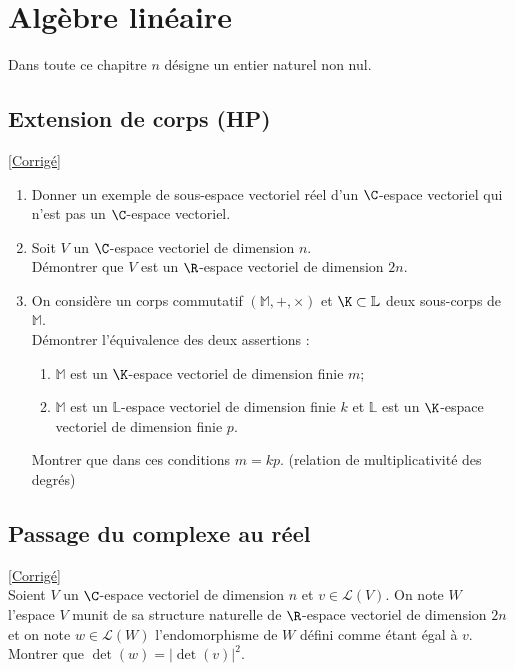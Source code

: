 \documentclass[8pt]{book}
\begin{document}
\chapter{Algèbre linéaire}
Dans toute ce chapitre $n$ désigne un entier naturel non nul.\\
\section{Extension de corps  (HP)}
\label{Extension de corps}
\textcolor{blue}{\hyperref[Extension de corps corrigé]{[Corrigé]}}\\
\begin{enumerate}[leftmargin=*]
	\item Donner un exemple de sous-espace vectoriel réel d'un $\C$-espace vectoriel qui n'est pas un $\C$-espace vectoriel.
	\item Soit $V$ un $\C$-espace vectoriel de dimension $n$.\\
	Démontrer que $V$ est un $\R$-espace vectoriel de dimension $2n$.
	\item On considère un corps commutatif $(\mathbb M,+,\times)$ et $\K\subset\mathbb L$ deux sous-corps de $\mathbb M$. \\
	Démontrer l'équivalence des deux assertions :
	\begin{enumerate}[label=(\roman*)]
		\item $\mathbb M$ est un $\K$-espace vectoriel de dimension finie $m$;
		\item $\mathbb M$ est un $\mathbb L$-espace vectoriel de dimension finie $k$ et $\mathbb L$ est un $\K$-espace vectoriel de dimension finie $p$.
	\end{enumerate}
	Montrer que dans ces conditions $m=kp$. (relation de multiplicativité des degrés)
\end{enumerate}

\section{Passage du complexe au réel }
\label{Passage du complexe au réel}
\textcolor{blue}{\hyperref[Passage du complexe au réel corrigé]{[Corrigé]}}\\
Soient $V$ un $\C$-espace vectoriel de dimension $n$ et $v\in \mathcal L(V)$. On note $W$ l'espace $V$ munit de sa structure naturelle de $\R$-espace vectoriel de dimension $2n$ et on note $w\in \mathcal L(W)$ l'endomorphisme de $W$ défini comme étant égal à $v$.\\
Montrer que $\det(w)=|\det(v)|^2$.
\end{document}
